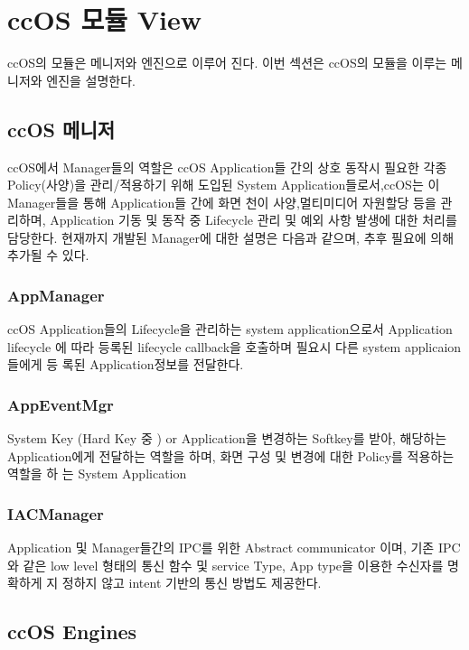 \lipsum[1]

\lipsum[1]
\frameboxend


\section{ccOS 모듈 View}
ccOS의 모듈은 메니저와 엔진으로 이루어 진다. 이번 섹션은 ccOS의 모듈을 이루는 메니저와 엔진을 설명한다. 
\subsection{ccOS 메니저}
ccOS에서 Manager들의 역할은 ccOS Application들 간의 상호 동작시 필요한 각종 Policy(사양)을 관리/적용하기 위해 도입된 System Application들로서,ccOS는 이 Manager들을 통해 Application들 간에 화면 천이 사양,멀티미디어 자원할당 등을 관리하며, Application 기동 및 동작 중 Lifecycle 관리 및 예외 사항 발생에 대한 처리를 담당한다.
현재까지 개발된 Manager에 대한 설명은 다음과 같으며, 추후 필요에 의해 추가될 수 있다.

\subsubsection{AppManager}
ccOS Application들의 Lifecycle을 관리하는 system application으로서 Application lifecycle 에 따라 등록된 lifecycle callback을 호출하며 필요시 다른 system applicaion들에게 등 록된 Application정보를 전달한다.

\subsubsection{AppEventMgr}
System Key (Hard Key 중 ) or Application을 변경하는 Softkey를 받아, 해당하는 Application에게 전달하는 역할을 하며, 화면 구성 및 변경에 대한 Policy를 적용하는 역할을 하 는 System Application
\subsubsection{IACManager}
Application 및 Manager들간의 IPC를 위한 Abstract communicator 이며, 기존 IPC와 같은 low level 형태의 통신 함수 및 service Type, App type을 이용한 수신자를 명확하게 지 정하지 않고 intent 기반의 통신 방법도 제공한다.

\subsection{ccOS Engines}

